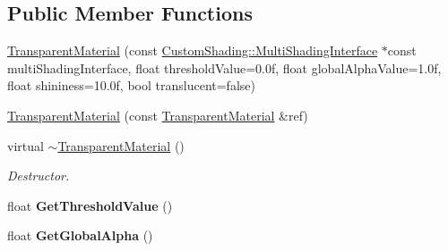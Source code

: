 \subsection*{Public Member Functions}
\begin{DoxyCompactItemize}
\item 
\mbox{\hyperlink{class_geometry_engine_1_1_geometry_material_1_1_transparent_material_af6792dc3a5911bdb3ee803d5a129088a}{Transparent\+Material}} (const \mbox{\hyperlink{class_geometry_engine_1_1_custom_shading_1_1_multi_shading_interface}{Custom\+Shading\+::\+Multi\+Shading\+Interface}} $\ast$const multi\+Shading\+Interface, float threshold\+Value=0.\+0f, float global\+Alpha\+Value=1.\+0f, float shininess=10.\+0f, bool translucent=false)
\item 
\mbox{\hyperlink{class_geometry_engine_1_1_geometry_material_1_1_transparent_material_a1687629a2e24bc6b2ef6971723111eee}{Transparent\+Material}} (const \mbox{\hyperlink{class_geometry_engine_1_1_geometry_material_1_1_transparent_material}{Transparent\+Material}} \&ref)
\item 
\mbox{\label{class_geometry_engine_1_1_geometry_material_1_1_transparent_material_a7a71619c3cb1214c1b3e31fd752341e2}} 
virtual \mbox{\hyperlink{class_geometry_engine_1_1_geometry_material_1_1_transparent_material_a7a71619c3cb1214c1b3e31fd752341e2}{$\sim$\+Transparent\+Material}} ()
\begin{DoxyCompactList}\small\item\em Destructor. \end{DoxyCompactList}\item 
\mbox{\label{class_geometry_engine_1_1_geometry_material_1_1_transparent_material_a54f17a71f747afdc27c3712a591cf4ab}} 
float {\bfseries Get\+Threshold\+Value} ()
\item 
\mbox{\label{class_geometry_engine_1_1_geometry_material_1_1_transparent_material_acbf5bf9a51d111ad8d020755716d13d1}} 
float {\bfseries Get\+Global\+Alpha} ()
\item 
\mbox{\label{class_geometry_engine_1_1_geometry_material_1_1_transparent_material_afc7175239967f643813558883b80a732}} 

\end{DoxyCompactItemize}
